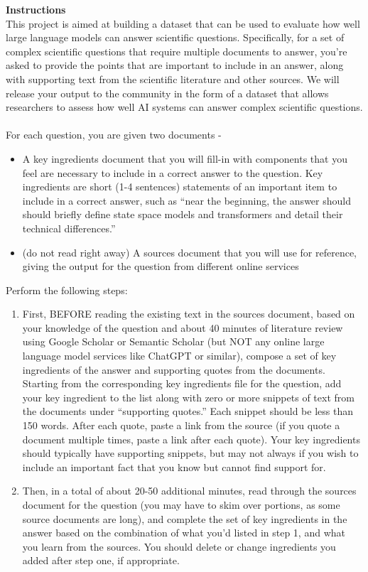\documentclass{article} %
\begin{document}
\begin{table}[h!]
\begin{tcolorbox}
{\bf Instructions}\\ 

This project is aimed at building a dataset that can be used to evaluate how well large language models can answer scientific questions.  Specifically, for a set of complex scientific questions that require multiple documents to answer, you’re asked to provide the points that are important to include in an answer, along with supporting text from the scientific literature and other sources.  We will release your output to the community in the form of a dataset that allows researchers to assess how well AI systems can answer complex scientific questions.
\\
\\
For each question, you are given two documents - 
\begin{itemize}
    \item A key ingredients document that you will fill-in with components that you feel are necessary to include in a correct answer to the question.
Key ingredients are short (1-4 sentences) statements of an important item to include in a correct answer, such as ``near the beginning, the answer should should briefly define state space models and transformers and detail their technical differences.''  
    \item (do not read right away) A sources document that you will use for reference, giving the output for the question from different online services
\end{itemize}
Perform the following steps:

\begin{enumerate}
    \item First, BEFORE reading the existing text in the sources document, based on your knowledge of the question and about 40 minutes of literature review using Google Scholar or Semantic Scholar (but NOT any online large language model services like ChatGPT or similar), compose a set of key ingredients of the answer and supporting quotes from the documents.  Starting from the corresponding key ingredients file for the question, add your key ingredient to the list along with zero or more snippets of text from the documents under ``supporting quotes.''  Each snippet should be less than 150 words.  After each quote, paste a link from the source (if you quote a document multiple times, paste a link after each quote).  Your key ingredients should typically have supporting snippets, but may not always if you wish to include an important fact that you know but cannot find support for.
    \item Then, in a total of about 20-50 additional minutes, read through the sources document  for the question (you may have to skim over portions, as some source documents are long), and complete the set of key ingredients in the answer based on the combination of what you’d listed in step 1, and what you learn from the sources.  You should delete or change ingredients you added after step one, if appropriate.  
    

\end{enumerate}
\end{tcolorbox}
\end{table}
\end{document}
